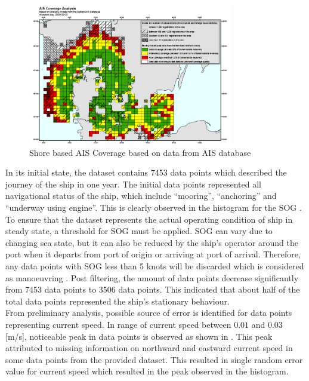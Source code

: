 \begin{figure}
    \centering
        \includegraphics[width=0.8\textwidth]{02_figures/AIS_Coverage.png}
        \caption{Shore based AIS Coverage based on data from AIS database \cite{webaisdk.2023}}
        \label{fig:aiscoverage}
\end{figure}

In its initial state, the dataset contains 7453 data points which described the journey of the ship in one year. The initial data points represented all navigational status of the ship, which include ``mooring'', ``anchoring'' and ``underway using engine''. This is clearly observed in the histogram for the SOG .\\ 

To ensure that the dataset represents the actual operating condition of ship in steady state, a threshold for SOG must be applied. SOG can vary due to changing sea state, but it can also be reduced by the ship's operator around the port when it departs from port of origin or arriving at port of arrival. Therefore, any data points with SOG less than 5 knots will be discarded which is considered as manoeuvring . Post filtering, the amount of data points decrease significantly from 7453 data points to 3506 data points. This indicated that about half of the total data points represented the ship's stationary behaviour.\\


From preliminary analysis, possible source of error is identified for data points representing current speed. In range of current speed between $0.01$ and $0.03$ [m/s], noticeable peak in data points is observed as shown in . This peak attributed to missing information on northward and eastward current speed in some data points from the provided dataset. This resulted in single random error value for current speed which resulted in the peak observed in the histogram.\\ 

